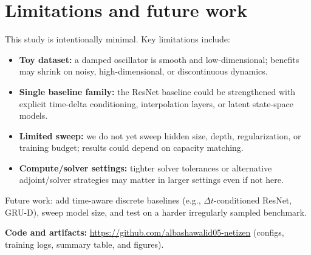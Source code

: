 ﻿\documentclass[10pt]{article}
\newcommand{\GithubURL}{https://github.com/albashawalid05-netizen}
\begin{document}
\section{Limitations and future work}
This study is intentionally minimal. Key limitations include:
\begin{itemize}
  \item \textbf{Toy dataset:} a damped oscillator is smooth and low-dimensional; benefits may shrink on noisy, high-dimensional, or discontinuous dynamics.
  \item \textbf{Single baseline family:} the ResNet baseline could be strengthened with explicit time-delta conditioning, interpolation layers, or latent state-space models.
  \item \textbf{Limited sweep:} we do not yet sweep hidden size, depth, regularization, or training budget; results could depend on capacity matching.
  \item \textbf{Compute/solver settings:} tighter solver tolerances or alternative adjoint/solver strategies may matter in larger settings even if not here.
\end{itemize}

Future work: add time-aware discrete baselines (e.g., $\Delta t$-conditioned ResNet, GRU-D), sweep model size, and test on a harder irregularly sampled benchmark.

\vspace{0.5em}
\noindent\textbf{Code and artifacts:} \href{\GithubURL}{\GithubURL} (configs, training logs, summary table, and figures).
\end{document}
